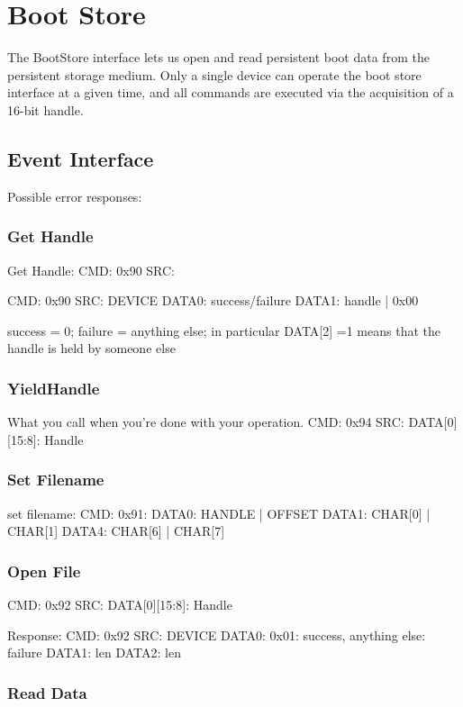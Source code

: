 \section{Boot Store}

The BootStore interface lets us open and read persistent boot data
from the persistent storage medium. Only a single device can operate
the boot store interface at a given time, and all commands are
executed via the acquisition of a 16-bit handle.

\subsection{Event Interface}

Possible error responses: 



\subsubsection{Get Handle}

Get Handle: 
CMD: 0x90
SRC: 

\response
CMD: 0x90
SRC: DEVICE
DATA0: success/failure
DATA1: handle | 0x00

success = 0; failure = anything else; 
in particular DATA[2] =1 means that the handle is held 
by someone else


\subsubsection{YieldHandle}
What you call when you're done with your operation. 
CMD: 0x94
SRC: 
DATA[0][15:8]: Handle



\subsubsection{Set Filename}
set filename: 
CMD: 0x91:
DATA0: HANDLE | OFFSET
DATA1:  CHAR[0] | CHAR[1]
DATA4:  CHAR[6] | CHAR[7]


\subsubsection{Open File} 
CMD: 0x92
SRC: 
DATA[0][15:8]: Handle

Response: 
CMD: 0x92
SRC: DEVICE
DATA0: 0x01: success, anything else: failure
DATA1: len
DATA2: len

\subsubsection{Read Data}

